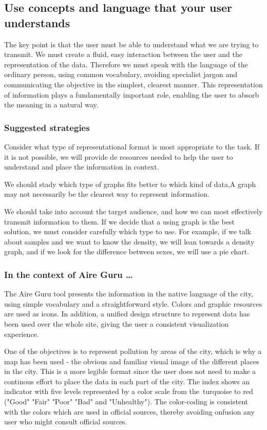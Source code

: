 \subsection{Use concepts and language that your user understands}

The key point is that the user must be able to understand what we are trying to transmit. We must create a fluid, 
easy interaction between the user and the representation of the data. Therefore we must speak with the language of 
the ordinary person, using common vocabulary, avoiding specialist jargon and communicating the objective in the simplest, 
clearest manner. This representation of information plays a fundamentally important role, enabling the user to absorb 
the meaning in a natural way.

\subsubsection*{Suggested strategies} 

Consider what type of representational format is most appropriate to the task. If it is not possible, we will provide de 
resources needed to help the user to understand and place the information in context. 

We should stady which type of graphs fits better to which kind of data,A graph may not necessarily be the 
clearest way to represent information.

We should take into account the target audience, and how we can most effectively transmit information to them. 
If we decide that a using graph is the best solution, we must consider carefully which type to use. For example, 
if we talk about samples and we want to know the density, we will lean towards a density graph, and if we look for the difference
between sexes, we will use a pie chart.

\subsubsection*{In the context of Aire Guru \ldots} 

The Aire Guru tool presents the information in the native language of the city, using simple vocabulary and a 
straightforward style.
Colors and graphic resources are used as icons. In addition, a unified design structure to represent data has 
been used over the whole site, giving the user a consistent visualization experience. 

One of the objectives is to represent pollution by areas of the city, which is why a map has been used - the 
obvious and familiar visual image of the different places in the city. This is a more legible format since the user
does not need to make a continous effort to place the data in each part of the city. The index shows an indicator with 
five levels represented by a color scale from the turquoise to red ("Good" "Fair" "Poor" "Bad" and "Unhealthy"). 
The color-coding is consistent with the colors which are used in official sources, thereby avoiding onfusion any 
user who might consult official sources.

